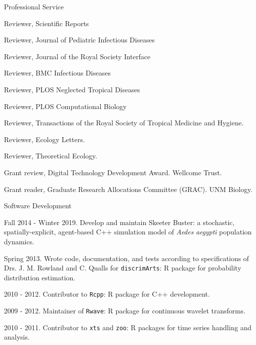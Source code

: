 \documentclass{resume} %
\begin{document}
\begin{rSection}{Professional Service}
\item Reviewer, Scientific Reports
\item Reviewer, Journal of Pediatric Infectious Diseases
\item Reviewer, Journal of the Royal Society Interface
\item Reviewer, BMC Infectious Diseases
\item Reviewer, PLOS Neglected Tropical Diseases
\item Reviewer, PLOS Computational Biology
\item Reviewer, Transactions of the Royal Society of Tropical Medicine and Hygiene.
\item Reviewer, Ecology Letters.
\item Reviewer, Theoretical Ecology.
\item Grant review, Digital Technology Development Award. Wellcome Trust.
\item Grant reader, Graduate Research Allocations Committee (GRAC). UNM Biology.
\end{rSection}

\begin{rSection}{Software Development}
\item Fall 2014 - Winter 2019. Develop and maintain Skeeter Buster: a stochastic,
spatially-explicit, agent-based C++ simulation model of {\em Aedes aegypti}
population dynamics.
\item Spring 2013. Wrote code, documentation, and tests according to
specifications of Drs. J. M. Rowland and C. Qualls for \texttt{discrimArts}: R package for probability
distribution estimation.
\item 2010 - 2012. Contributor to \texttt{Rcpp}: R package for C++ development.
\item 2009 - 2012. Maintainer of \texttt{Rwave}: R package for continuous wavelet transforms.
\item 2010 - 2011. Contributor to \texttt{xts} and \texttt{zoo}: R packages for time series handling and analysis.
\end{rSection}

\clearpage
\end{document}
